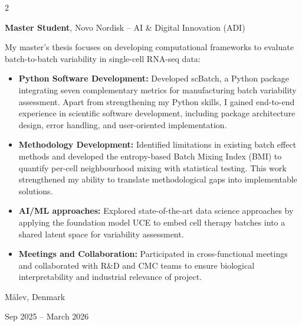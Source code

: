 \documentclass[10pt, letterpaper]{article}
\newenvironment{highlights}{
    \begin{itemize}[
        topsep=0.10 cm,
        parsep=0.10 cm,
        partopsep=0pt,
        itemsep=0pt,
        leftmargin=0.4 cm + 10pt
    ]
}{
    \end{itemize}
}
\newenvironment{twocolentry}[2][]{
    \onecolentry
    \def\secondColumn{#2}
    \setcolumnwidth{\fill, 4.5 cm}
    \begin{paracol}{2}
}{
    \switchcolumn \raggedleft \secondColumn
    \end{paracol}
    \endonecolentry
}
\begin{document}
        \begin{twocolentry}{
    Målev, Denmark

    Sep 2025 -- March 2026
}
    \textbf{Master Student}, Novo Nordisk -- AI \& Digital Innovation (ADI)

    \vspace{0.1cm}

    My master's thesis focuses on developing computational frameworks to evaluate batch-to-batch variability in single-cell RNA-seq data:

    \begin{highlights}
        \item \textbf{Python Software Development:} Developed scBatch, a Python package integrating seven complementary metrics for manufacturing batch variability assessment. Apart from strengthening my Python skills, I gained end-to-end experience in scientific software development, including package architecture design, error handling, and user-oriented implementation.

        \vspace{0.1cm}

        \item \textbf{Methodology Development:} Identified limitations in existing batch effect methods and developed the entropy-based Batch Mixing Index (BMI) to quantify per-cell neighbourhood mixing with statistical testing. This work strengthened my ability to translate methodological gaps into implementable solutions.

        \vspace{0.1cm}

        \item \textbf{AI/ML approaches:} Explored state-of-the-art data science approaches by applying the foundation model UCE to embed cell therapy batches into a shared latent space for variability assessment.

        \vspace{0.1cm}

        \item \textbf{Meetings and Collaboration:} Participated in cross-functional meetings and collaborated with R\&D and CMC teams to ensure biological interpretability and industrial relevance of project.
    \end{highlights}
\end{twocolentry}

        \vspace{0.3 cm}
\end{document}
